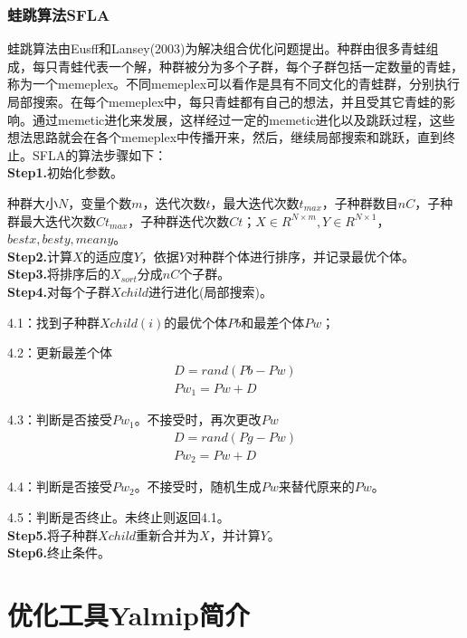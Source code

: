     \subsection{蛙跳算法SFLA}
        \par
        蛙跳算法由Eusff和Lansey(2003)为解决组合优化问题提出。种群由很多青蛙组成，每只青蛙代表一个解，种群被分为多个子群，每个子群包括一定数量的青蛙，称为一个memeplex。不同memeplex可以看作是具有不同文化的青蛙群，分别执行局部搜索。在每个memeplex中，每只青蛙都有自己的想法，并且受其它青蛙的影响。通过memetic进化来发展，这样经过一定的memetic进化以及跳跃过程，这些想法思路就会在各个memeplex中传播开来，然后，继续局部搜索和跳跃，直到终止。SFLA的算法步骤如下：\\
        \textbf{Step1.}初始化参数。
        \par
        种群大小$N$，变量个数$m$，迭代次数$t$，最大迭代次数$t_{max}$，子种群数目$nC$，子种群最大迭代次数$Ct_{max}$，子种群迭代次数$Ct$；$X\in R^{N\times m},Y\in R^{N\times 1}$，$bestx,besty,meany$。\\
        \textbf{Step2.}计算$X$的适应度$Y$，依据$Y$对种群个体进行排序，并记录最优个体。\\
        \textbf{Step3.}将排序后的$X_{sort}$分成$nC$个子群。\\
        \textbf{Step4.}对每个子群$Xchild$进行进化(局部搜索)。
        \par
        4.1：找到子种群$Xchild(i)$的最优个体$Pb$和最差个体$Pw$；
        \par
        4.2：更新最差个体
        \begin{align*}
        D = rand(Pb - Pw)\\
        Pw_1 = Pw+D
        \end{align*}
        \par
        4.3：判断是否接受$Pw_1$。不接受时，再次更改$Pw$
        \begin{align*}
        D = rand(Pg - Pw)\\
        Pw_2 = Pw+D
        \end{align*}
        \par
        4.4：判断是否接受$Pw_2$。不接受时，随机生成$Pw$来替代原来的$Pw$。
        \par
        4.5：判断是否终止。未终止则返回4.1。\\
        \textbf{Step5.}将子种群$Xchild$重新合并为$X$，并计算$Y$。\\
        \textbf{Step6.}终止条件。

\chapter{优化工具Yalmip简介}
